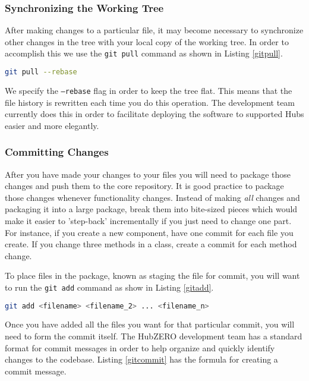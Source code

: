 \documentclass[10pt,letterpaper,titlepage]{article}
\begin{document}
\subsubsection{Synchronizing the Working Tree}
After making changes to a particular file, it may become necessary to synchronize other changes in the tree with your local copy of the working tree. In order
to accomplish this we use the \texttt{git pull} command as shown in Listing \ref{gitpull}. 

\begin{lstlisting}[caption={Using git to pull in recent changes to your working tree.},label=gitpull,language=Bash]
git pull --rebase 
\end{lstlisting}

We specify the \texttt{--rebase} flag in order to keep the tree flat. This means that the file history is rewritten each time you do this operation. The development team currently does this in order to facilitate deploying the
software to supported Hubs easier and more elegantly.

\subsubsection{Committing Changes}
\label{commitchangesgit}
After you have made your changes to your files you will need to package those changes and push them to the core repository. It is good practice to package those changes whenever functionality changes.
Instead of making \emph{all} changes and packaging it into a large package, break them into bite-sized pieces which would make it easier to 'step-back' incrementally if you just need to change one part.
For instance, if you create a new component, have one commit for each file you create. If you change three methods in a class, create a commit for each method change.

To place files in the package, known as staging the file for commit, you will want to run the \texttt{git add} command as show in Listing \ref{gitadd}.

\begin{lstlisting}[caption={Adding files to a commit.},language=Bash,label=gitadd]
git add <filename> <filename_2> ... <filename_n>
\end{lstlisting}

Once you have added all the files you want for that particular commit, you will need to form the commit itself. The HubZERO development team has a standard format for commit messages in order to help organize
and quickly identify changes to the codebase. Listing \ref{gitcommit} has the formula for creating a commit message.
\end{document}
